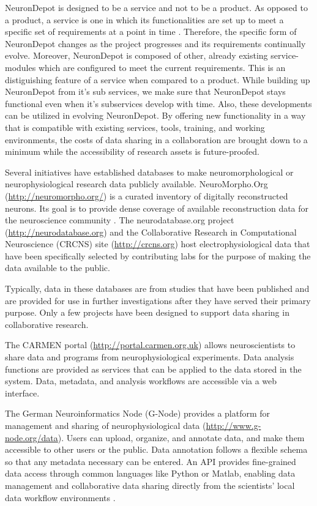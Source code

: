 \documentclass{frontiersSCNS} %
\begin{document}
NeuronDepot is designed to be a service and not to be a product. As opposed to
a product, a service is one in which its functionalities are set up to meet a
specific set of requirements at a point in time \citep{truex_growing_1999,
bennett_service-based_2000, bullinger_service_2003}. Therefore, the specific
form of NeuronDepot changes as the project progresses and its requirements
continually evolve. Moreover, NeuronDepot is composed of other, already
existing service-modules which are configured to meet the current requirements.
This is an distiguishing feature of a service when compared to a product. While
building up NeuronDepot from it’s sub services, we make sure that NeuronDepot
stays functional even when it’s subservices develop with time. Also, these
developments can be utilized in evolving NeuronDepot. By offering new
functionality in a way that is compatible with existing services, tools,
training, and working environments, the costs of data sharing in a
collaboration are brought down to a minimum while the accessibility of research
assets is future-proofed.

Several initiatives have established databases to make neuromorphological or
neurophysiological research data publicly available.  NeuroMorpho.Org
(\url{http://neuromorpho.org/}) is a curated inventory of digitally
reconstructed neurons. Its goal is to provide dense coverage of available
reconstruction data for the neuroscience community \citep{Ascoli2007}.  The
neurodatabase.org project (\url{http://neurodatabase.org}) and the
Collaborative Research in Computational Neuroscience (CRCNS) site
(\url{http://crcns.org}) host electrophysiological data that have been
specifically selected by contributing labs for the purpose of making the data
available to the public.

Typically, data in these databases are from studies that have been published
and are provided for use in further investigations after they have served their
primary purpose.  Only a few projects have been designed to support data
sharing in collaborative research.

The CARMEN portal (\url{http://portal.carmen.org.uk}) allows neuroscientists to
share data and programs from neurophysiological experiments.  Data analysis
functions are provided as services that can be applied to the data stored in
the system.  Data, metadata, and analysis workflows are accessible via a web
interface.

The German Neuroinformatics Node (G-Node) provides a platform for management
and sharing of neurophysiological data (\url{http://www.g-node.org/data}).
Users can upload, organize, and annotate data, and make them accessible to
other users or the public.  Data annotation follows a flexible schema \citep{Grewe2011} so that any metadata necessary can be entered.  An API provides
fine-grained data access through common languages like Python or Matlab,
enabling data management and collaborative data sharing directly from the
scientists' local data workflow environments \citep[][under
review]{Sobolev2014}.
\end{document}
